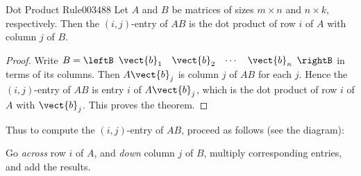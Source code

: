 \begin{theorem}{Dot Product Rule}{003488}
Let $A$ and $B$ be matrices of sizes $m \times n$ and $n \times k$, respectively. Then the $(i, j)$-entry of $AB$ is the dot 
product of row $i$ of $A$ with column $j$ of $B$.
\end{theorem}

\begin{proof}
Write $B = \leftB \begin{array}{cccc}
\vect{b}_{1} & \vect{b}_{2} & \cdots & \vect{b}_{n}
\end{array} \rightB$ in terms of its columns. Then $A\vect{b}_{j}$ is column $j$ of $AB$ for each $j$. Hence the $(i, j)$-entry of $AB$ is entry $i$ of $A\vect{b}_{j}$, which is the dot product of row $i$ of $A$ with $\vect{b}_{j}$. This proves the theorem.
\end{proof}

\noindent Thus to compute the $(i, j)$-entry of $AB$, proceed as follows (see the diagram):


\begin{center}
Go \textit{across} row $i$ of $A$, and \textit{down} column $j$ of $B$, multiply corresponding entries, and add the results.
\end{center}

